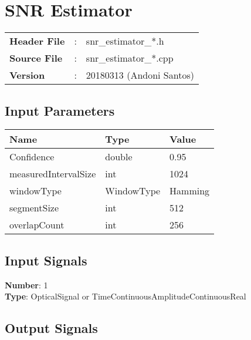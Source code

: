\clearpage

\section{SNR Estimator}

\begin{tcolorbox}	
	\begin{tabular}{p{2.75cm} p{0.2cm} p{10.5cm}} 	
		\textbf{Header File}   &:& snr\_estimator\_*.h \\
		\textbf{Source File}   &:& snr\_estimator\_*.cpp \\
		\textbf{Version}	   &:& 20180313 (Andoni Santos)
	\end{tabular}
\end{tcolorbox}

\subsection*{Input Parameters}

\begin{table}[H]
	\centering
	\begin{tabular}{|l|l|l|}
		\hline
		\textbf{Name}  		 & \textbf{Type}  & \textbf{Value}    	\\\hline
		Confidence     		 & double         & 0.95              	\\\hline
		measuredIntervalSize & int 			  & 1024				\\\hline
		windowType			 & WindowType     & Hamming			  	\\\hline
		segmentSize			 & int			  & 512					\\\hline
		overlapCount  		 & int			  & 256					\\\hline
	\end{tabular}
\end{table}

\subsection*{Input Signals}

\textbf{Number}: 1\\
\textbf{Type}: OpticalSignal or TimeContinuousAmplitudeContinuousReal

\subsection*{Output Signals}


